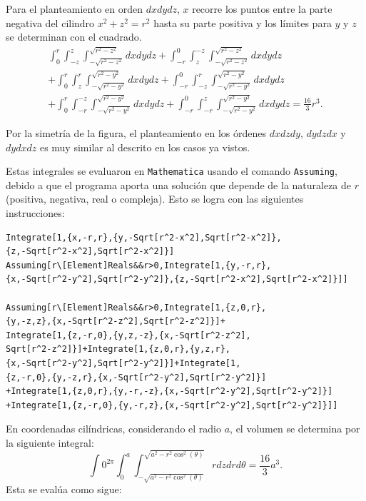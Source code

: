 Para el planteamiento en  orden $dxdydz$, $x$ recorre los puntos entre la parte negativa del cilindro $x^2+z^2=r^2$ hasta su parte positiva y los límites para $y$ y $z$
se determinan con el cuadrado.
%
\begin{multline*}
\int_{0}^{r}\int_{-z}^{z}\int_{-\sqrt{r^{2}-z^{2}}}^{\sqrt{r^{2}-z^{2}}}dxdydz+\int_{-r}^{0}\int_{z}^{-z}\int_{-\sqrt{r^{2}-z^{2}}}^{\sqrt{r^{2}-z^{2}}}dxdydz \\
+\int_{0}^{r}\int_{z}^{r}\int_{-\sqrt{r^{2}-y^{2}}}^{\sqrt{r^{2}-y^{2}}}dxdydz +\int_{-r}^{0}\int_{-z}^{r}\int_{-\sqrt{r^{2}-y^{2}}}^{\sqrt{r^{2}-y^{2}}}dxdydz\\
+\int_{0}^{r}\int_{-r}^{-z}\int_{-\sqrt{r^{2}-y^{2}}}^{\sqrt{r^{2}-y^{2}}}dxdydz+\int_{-r}^{0}\int_{-r}^{z}\int_{-\sqrt{r^{2}-y^{2}}}^{\sqrt{r^{2}-y^{2}}}dxdydz=\frac{16}{3}r^{3}.
\end{multline*}

Por la simetría de la figura, el planteamiento en los órdenes $dxdzdy$, $dydzdx$ y $dydxdz$ es muy similar al descrito en los casos ya vistos.

Estas integrales se evaluaron en \Verb"Mathematica" usando el comando \Verb"Assuming",
debido a que el programa aporta una solución que depende de la naturaleza de $r$
(positiva, negativa, real o compleja). Esto se logra con las siguientes instrucciones:

\begin{tcolorbox}[title=\bf Instrucción en \verb"Mathematica"]\begin{Verbatim}[formatcom=\letraverbatim]
Integrate[1,{x,-r,r},{y,-Sqrt[r^2-x^2],Sqrt[r^2-x^2]},
{z,-Sqrt[r^2-x^2],Sqrt[r^2-x^2]}]
Assuming[r\[Element]Reals&&r>0,Integrate[1,{y,-r,r},
{x,-Sqrt[r^2-y^2],Sqrt[r^2-y^2]},{z,-Sqrt[r^2-x^2],Sqrt[r^2-x^2]}]]

Assuming[r\[Element]Reals&&r>0,Integrate[1,{z,0,r},
{y,-z,z},{x,-Sqrt[r^2-z^2],Sqrt[r^2-z^2]}]+
Integrate[1,{z,-r,0},{y,z,-z},{x,-Sqrt[r^2-z^2],
Sqrt[r^2-z^2]}]+Integrate[1,{z,0,r},{y,z,r},
{x,-Sqrt[r^2-y^2],Sqrt[r^2-y^2]}]+Integrate[1,
{z,-r,0},{y,-z,r},{x,-Sqrt[r^2-y^2],Sqrt[r^2-y^2]}]
+Integrate[1,{z,0,r},{y,-r,-z},{x,-Sqrt[r^2-y^2],Sqrt[r^2-y^2]}]
+Integrate[1,{z,-r,0},{y,-r,z},{x,-Sqrt[r^2-y^2],Sqrt[r^2-y^2]}]]
\end{Verbatim}
\end{tcolorbox}

En coordenadas cilíndricas, considerando el radio $a$, el volumen se determina por la siguiente integral:
\[\int 0^{2 \pi }\int _0^a\int _{-\sqrt{a^2-r^2 \cos ^2(\theta)}}^{\sqrt{a^2-r^2\cos^2(\theta)}}rdzdrd\theta=\frac{16}{3}a^{3}.\]
Esta se evalúa como sigue:

